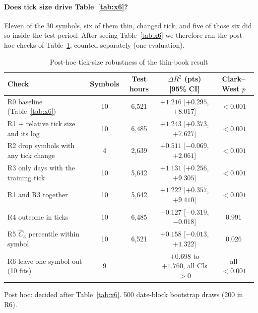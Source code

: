 \paragraph{Does tick size drive Table~\ref{tab:x6}?} Eleven of the 30 symbols, six of them thin, changed tick, and five of those six did so inside the test period. After seeing Table~\ref{tab:x6} we therefore ran the post-hoc checks of Table~\ref{tab:x6r}, counted separately (one evaluation).

\begin{table}[t]\centering\small
\begin{threeparttable}
\caption{Post-hoc tick-size robustness of the thin-book result}\label{tab:x6r}
\setlength{\tabcolsep}{3pt}
\begin{tabular}{p{}cccc}
\toprule
Check & Symbols & Test hours & $\Delta R^2$ (pts) [95\% CI] & Clark--West $p$\\
\midrule
R0 baseline (Table~\ref{tab:x6}) & 10 & 6{,}521 & $+1.216$ [$+0.295$, $+8.017$] & $<0.001$\\
R1 + relative tick size and its log & 10 & 6{,}485 & $+1.243$ [$+0.373$, $+7.627$] & $<0.001$\\
R2 drop symbols with any tick change & 4 & 2{,}639 & $+0.511$ [$-0.069$, $+2.061$] & $<0.001$\\
R3 only days with the training tick & 10 & 5{,}642 & $+1.131$ [$+0.256$, $+9.305$] & $<0.001$\\
R1 and R3 together & 10 & 5{,}642 & $+1.222$ [$+0.357$, $+9.410$] & $<0.001$\\
R4 outcome in ticks & 10 & 6{,}485 & $-0.127$ [$-0.319$, $-0.018$] & 0.991\\
R5 $\hat C_3$ percentile within symbol & 10 & 6{,}521 & $+0.158$ [$-0.013$, $+1.322$] & 0.026\\
R6 leave one symbol out (10 fits) & 9 & & $+0.698$ to $+1.760$, all CIs $>0$ & all $<0.001$\\
\bottomrule
\end{tabular}
\begin{tablenotes}\footnotesize\item Post hoc: decided after Table~\ref{tab:x6}. 500 date-block bootstrap draws (200 in R6). \end{tablenotes}
\end{threeparttable}
\end{table}

